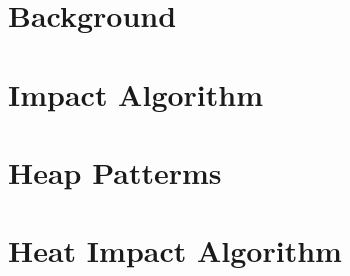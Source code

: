 \documentclass[12pt, letterpaper]{report}
\begin{document}
\chapter{Background}


\chapter{Impact Algorithm}


\chapter{Heap Patterms}


\chapter{Heat Impact Algorithm}


% 

% 

% 

% 

% 

% 


\small

\end{document}
